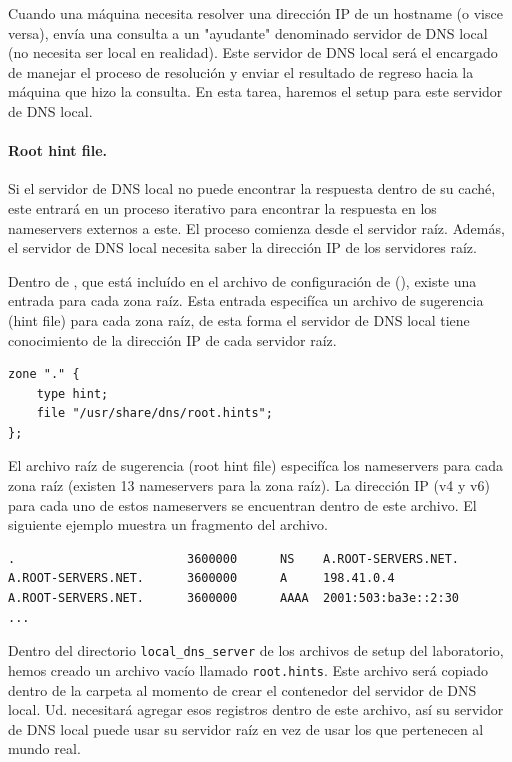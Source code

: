 Cuando una máquina necesita resolver una dirección IP de un hostname (o visce versa), envía una consulta a un "ayudante" denominado servidor de DNS local (no necesita ser local en realidad). Este servidor de DNS local será el encargado de manejar el proceso de resolución y enviar el resultado de regreso hacia la máquina que hizo la consulta.
En esta tarea, haremos el setup para este servidor de DNS local.


\paragraph{Root hint file.}
Si el servidor de DNS local no puede encontrar la respuesta dentro de su caché, este entrará en un proceso iterativo para encontrar la respuesta en los nameservers externos a este. El proceso comienza desde el servidor raíz.
Además, el servidor de DNS local necesita saber la dirección IP de los servidores raíz.

Dentro de , que está incluído en el archivo de configuración de \bind (), existe una entrada para cada zona raíz. Esta entrada especifíca un archivo de sugerencia (hint file) para cada zona raíz, de esta forma el servidor de DNS local tiene conocimiento de la dirección IP de cada servidor raíz.


\begin{lstlisting}
zone "." {
	type hint;
	file "/usr/share/dns/root.hints";
};
\end{lstlisting}

El archivo raíz de sugerencia (root hint file) especifíca los nameservers para cada zona raíz (existen 13 nameservers para la zona raíz). La dirección IP (v4 y v6) para cada uno de estos nameservers se encuentran dentro de este archivo.
El siguiente ejemplo muestra un fragmento del archivo.

\begin{lstlisting}
.                        3600000      NS    A.ROOT-SERVERS.NET.
A.ROOT-SERVERS.NET.      3600000      A     198.41.0.4
A.ROOT-SERVERS.NET.      3600000      AAAA  2001:503:ba3e::2:30
...
\end{lstlisting}

Dentro del directorio \texttt{local\_dns\_server} de los archivos de setup del laboratorio, hemos creado un archivo vacío llamado \texttt{root.hints}. Este archivo será copiado dentro de la carpeta  al momento de crear el contenedor del servidor de DNS local.
Ud. necesitará agregar esos registros dentro de este archivo, así su servidor de DNS local puede usar su servidor raíz en vez de usar los que pertenecen al mundo real.


